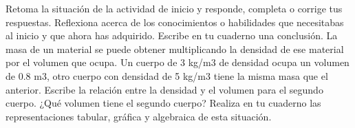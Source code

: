 \documentclass[11pt]{book}
\begin{document}
\begin{enumerate}
        \begin{boxF}

          Retoma la situación de la actividad de inicio y responde, completa o corrige tus respuestas. Reflexiona acerca de los conocimientos o habilidades que necesitabas al inicio y que ahora has adquirido. Escribe en tu cuaderno una conclusión.
          La masa de un material se puede obtener multiplicando la densidad de ese material por el volumen que ocupa. Un cuerpo de 3 kg/m3 de densidad ocupa un volumen de 0.8 m3, otro cuerpo con densidad de 5 kg/m3 tiene la misma masa que el anterior.
          Escribe la relación entre la densidad y el volumen para el segundo cuerpo.
          ¿Qué volumen tiene el segundo cuerpo?
          Realiza en tu cuaderno las representaciones tabular, gráfica y algebraica de esta situación.
        \end{boxF}
\end{enumerate}
\newpage
\end{document}
